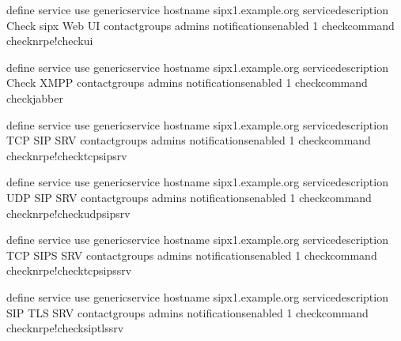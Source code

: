 \documentclass[letterpaper,10pt,english]{sphinxmanual}
\begin{document}
\begin{sphinxVerbatim}[commandchars=\\\{\}]
define service\PYGZob{}
        use                             generic\PYGZhy{}service
        host\PYGZus{}name                       sipx1.example.org
        service\PYGZus{}description             Check sipx Web UI
        contact\PYGZus{}groups                  admins
        notifications\PYGZus{}enabled           1
        check\PYGZus{}command                   check\PYGZus{}nrpe!check\PYGZus{}ui
        \PYGZcb{}

define service\PYGZob{}
        use                             generic\PYGZhy{}service
        host\PYGZus{}name                       sipx1.example.org
        service\PYGZus{}description             Check XMPP
        contact\PYGZus{}groups                  admins
        notifications\PYGZus{}enabled           1
        check\PYGZus{}command                   check\PYGZus{}jabber
        \PYGZcb{}

define service\PYGZob{}
        use                             generic\PYGZhy{}service
        host\PYGZus{}name                       sipx1.example.org
        service\PYGZus{}description             TCP SIP SRV
        contact\PYGZus{}groups                  admins
        notifications\PYGZus{}enabled           1
        check\PYGZus{}command                   check\PYGZus{}nrpe!check\PYGZus{}tcp\PYGZus{}sip\PYGZus{}srv
        \PYGZcb{}

define service\PYGZob{}
        use                             generic\PYGZhy{}service
        host\PYGZus{}name                       sipx1.example.org
        service\PYGZus{}description             UDP SIP SRV
        contact\PYGZus{}groups                  admins
        notifications\PYGZus{}enabled           1
        check\PYGZus{}command                   check\PYGZus{}nrpe!check\PYGZus{}udp\PYGZus{}sip\PYGZus{}srv
        \PYGZcb{}

define service\PYGZob{}
        use                             generic\PYGZhy{}service
        host\PYGZus{}name                       sipx1.example.org
        service\PYGZus{}description             TCP SIPS SRV
        contact\PYGZus{}groups                  admins
        notifications\PYGZus{}enabled           1
        check\PYGZus{}command                   check\PYGZus{}nrpe!check\PYGZus{}tcp\PYGZus{}sips\PYGZus{}srv
        \PYGZcb{}

define service\PYGZob{}
        use                             generic\PYGZhy{}service
        host\PYGZus{}name                       sipx1.example.org
        service\PYGZus{}description             SIP TLS SRV
        contact\PYGZus{}groups                  admins
        notifications\PYGZus{}enabled           1
        check\PYGZus{}command                   check\PYGZus{}nrpe!check\PYGZus{}sip\PYGZus{}tls\PYGZus{}srv
        \PYGZcb{}


\end{sphinxVerbatim}
\end{document}
